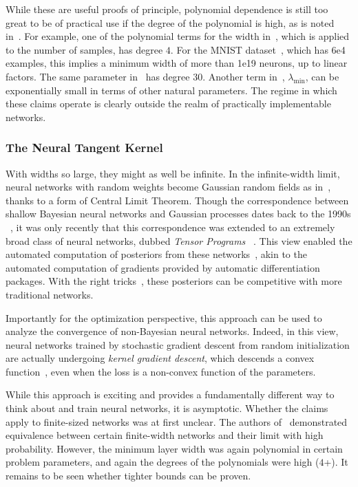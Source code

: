 \documentclass[../../thesis.tex]{subfiles}
\begin{document}
While these are useful proofs of principle,
polynomial dependence is still too great to be of practical use
if the degree of the polynomial is high,
as is noted in~\cite{allenzhu2018}.
For example, one of the polynomial terms for the width in~\cite{du2018},
which is applied to the number of samples, has degree $4$.
For the MNIST dataset~\cite{lecun2010},
which has 6e4 examples,
this implies a minimum width of more than 1e19 neurons,
up to linear factors.
The same parameter in~\cite{allenzhu2018} has degree $30$.
Another term in~\cite{du2018}, $\lambda_{\min}$,
can be exponentially small in terms of other natural parameters.
The regime in which these claims operate
is clearly outside the realm of practically implementable networks.

\subsubsection{The Neural Tangent Kernel}

With widths so large,
they might as well be infinite.
In the infinite-width limit,
neural networks with random weights become
Gaussian random fields as in~,
thanks to a form of Central Limit Theorem.
Though the correspondence between shallow Bayesian neural networks
and Gaussian processes dates back to the 1990s%
~\cite{neal1996},
it was only recently that this correspondence was extended
to an extremely broad class of neural networks,
dubbed \emph{Tensor Programs}%
~\cite{yang2019}.
This view enabled the automated computation of posteriors
from these networks~\cite{novak2019},
akin to the automated computation of gradients
provided by automatic differentiation packages.
With the right tricks~\cite{li2019},
these posteriors can be competitive
with more traditional networks.

Importantly for the optimization perspective,
this approach can be used to analyze
the convergence of non-Bayesian neural networks.
Indeed, in this view, neural networks trained by
stochastic gradient descent from random initialization
are actually undergoing \emph{kernel gradient descent},
which descends a convex function~\cite{jacot2018},
even when the loss is a non-convex function of the parameters.

While this approach is exciting
and provides a fundamentally different way
to think about and train neural networks,
it is asymptotic.
Whether the claims apply to finite-sized networks was at first unclear.
The authors of~\cite{arora2019}
demonstrated equivalence between certain finite-width networks
and their limit with high probability.
However, the minimum layer width was again polynomial in certain problem parameters,
and again the degrees of the polynomials were high ($4$+).
It remains to be seen whether tighter bounds can be proven.
\end{document}
